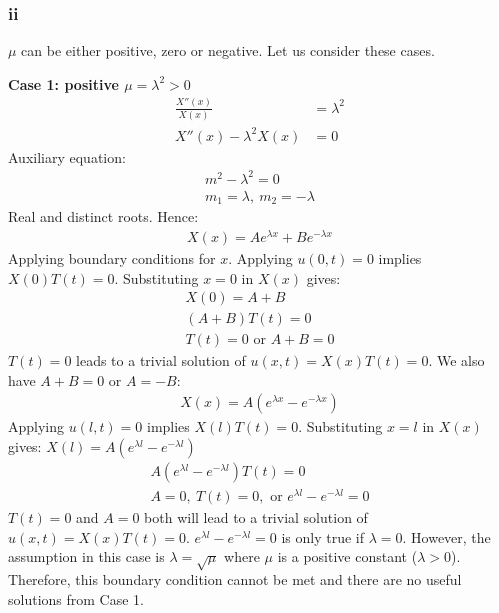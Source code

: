 \documentclass[11pt]{article}
\numberwithin{equation}{section}
\begin{document}
\subsubsection*{ii}
$\mu$ can be either positive, zero or negative. Let us consider these cases. 

\textbf{Case 1: positive $\mu = \lambda^2 > 0$}
\begin{align}
	\frac{X''\left(x\right)}{X\left(x\right)} &= \lambda^2\\
	X''\left(x\right) - \lambda^2X\left(x\right) &= 0 
\end{align}
Auxiliary equation:
\begin{gather}
	m^2 - \lambda^2 = 0\\
	m_1 = \lambda, \ m_2 = -\lambda
\end{gather}
Real and distinct roots. Hence:
\begin{align}
	X(x) = Ae^{\lambda x} + Be^{-\lambda x}
\end{align}
Applying boundary conditions for $x$. Applying $u\left(0,t\right) = 0$ implies $X(0)T(t) = 0$. Substituting $x=0$ in $X(x)$ gives:
\begin{gather}
	X(0) = A + B\\
	\left(A+B\right)T(t) = 0\\
	T(t) = 0 \textrm{ or } A + B =0
\end{gather}
$T(t) = 0$ leads to a trivial solution of $u(x,t) = X(x)T(t) = 0$. We also have $A + B = 0$ or $A = - B$:
\begin{gather}
	X(x) = A\left(e^{\lambda x} - e^{-\lambda x}\right)
\end{gather}
Applying $u(l,t) = 0$ implies $X(l)T(t) = 0$. Substituting $x=l$ in $X(x)$ gives: $X(l) = A\left(e^{\lambda l} - e^{-\lambda l}\right)$
\begin{gather}
	A\left(e^{\lambda l} - e^{-\lambda l}\right)T(t) = 0\\
	A = 0, \ T(t) = 0, \textrm{ or } e^{\lambda l} - e^{-\lambda l} = 0
\end{gather}
$T(t) = 0$ and $A=0$ both will lead to a trivial solution of $u(x,t) = X(x)T(t) =0$. $e^{\lambda l} - e^{-\lambda l} = 0$ is only true if $\lambda = 0$. However, the assumption in this case is $\lambda = \sqrt{\mu}$ where $\mu$ is a positive constant ($\lambda > 0$). Therefore, this boundary condition cannot be met and there are no useful solutions from Case 1.
\end{document}
